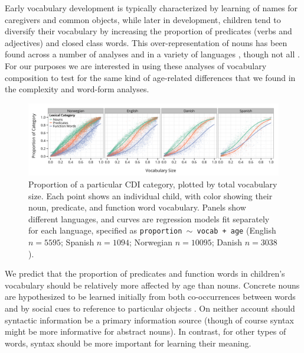 \documentclass[10pt,letterpaper]{article}
\begin{document}
Early vocabulary development is typically characterized by learning of names for caregivers and common objects, while later in development, children tend to diversify their vocabulary by increasing the proportion of predicates (verbs and adjectives) and closed class words. This over-representation of nouns has been found across a number of analyses and in a variety of languages \cite{bates1994,caselli1995,bornstein2004}, though not all \cite{tardif1996,choi1995}.
For our purposes we are interested in using these analyses of vocabulary composition to test for the same kind of age-related differences that we found in the complexity and word-form analyses. 

\begin{figure}
\begin{center}
\includegraphics[width=\linewidth]{plots/vocab_data_plot-1.png}
\end{center}
\caption{\label{fig:vocab_comp} Proportion of a particular CDI category, plotted by total vocabulary size. Each point shows an individual child, with color showing their noun, predicate, and function word vocabulary. Panels show different languages, and curves are regression models fit separately for each language, specified as \small{\tt{proportion $\sim$ vocab + age}} (English $n=5595$; Spanish $n=1094$; Norwegian $n=10095$; Danish $n=3038$).}
\end{figure}

We predict that the proportion of predicates and function words in children's vocabulary should be relatively more affected by age than nouns. Concrete nouns are hypothesized to be learned initially from both co-occurrences between words \cite{yu2007b} and by social cues to reference to particular objects \cite{bloom2002}. On neither account should syntactic information be a primary information source (though of course syntax might be more informative for abstract nouns). In contrast, for other types of words, syntax should be more important for learning their meaning.
\end{document}
